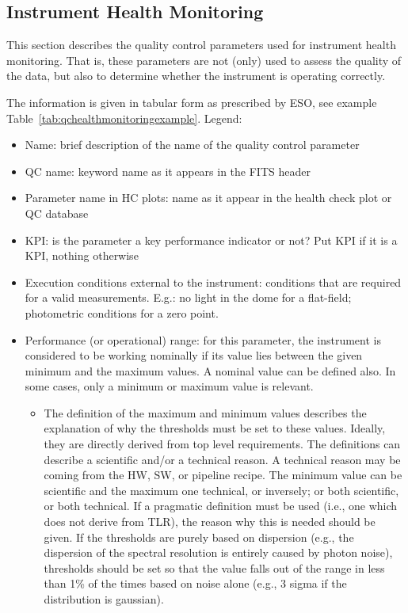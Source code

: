 \subsection{Instrument Health Monitoring}\label{sec:instrumenthealthmonitoring}

This section describes the quality control parameters used for instrument
health monitoring.
That is, these parameters are not (only) used to assess the quality of the
data, but also to determine whether the instrument is operating correctly.

The information is given in tabular form as prescribed by ESO,
see example Table~\ref{tab:qchealthmonitoringexample}.
Legend:

\begin{itemize}
    \item Name: brief description of the name of the quality control parameter
    \item QC name: keyword name as it appears in the FITS header
    \item Parameter name in HC plots: name as it appear in the health check plot or QC database
    \item KPI: is the parameter a key performance indicator or not? Put KPI if it is a KPI, nothing otherwise
    \item Execution conditions external to the instrument: conditions that are required for a valid measurements. E.g.: no light in the dome for a flat-field; photometric conditions for a zero point.
    \item Performance (or operational)  range: for this parameter, the instrument is considered to be working nominally if its value lies between the given minimum and the maximum values. A nominal value can be defined also. In some cases, only a minimum or maximum value is relevant.
    \begin{itemize}
        \item The definition of the maximum and minimum values describes the explanation of why the thresholds must be set to these values. Ideally, they are directly derived from top level requirements. The definitions can describe a scientific and/or a technical reason. A technical reason may be coming from the HW, SW, or pipeline recipe. The minimum value can be scientific and the maximum one technical, or inversely; or both scientific, or both technical. If a pragmatic definition must be used (i.e., one which does not derive from TLR), the reason why this is needed should be given. If the thresholds are purely based on dispersion (e.g., the dispersion of the spectral resolution is entirely caused by photon noise), thresholds should be set so that the value falls out of the range in less than 1\% of the times based on  noise alone (e.g., 3 sigma if the distribution is gaussian).

\end{itemize}
\end{itemize}
